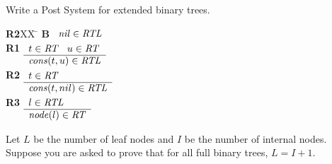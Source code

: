 \documentclass[]{exam}
\begin{document}
\begin{questions}
\begin{solution}
\end{solution}
\question Write a Post System for extended binary trees.
\begin{solution}
\begin{tabbing}
{\bf R2}XX \=  \kill
{\bf B} \>
        \(\begin{array}[t]{l}
        \mbox{\it nil\/}\in\mbox{\it RTL\/}
        \end{array}\) \\[2ex]
{\bf R1} \>
        \(\begin{array}[t]{l}
        t\in\mbox{\it RT\/}\;\;\;u\in\mbox{\it RT\/} \\
        \hline
        \mbox{\it cons\/}(t,u)\in\mbox{\it RTL\/}
        \end{array}\) \\[2ex]
{\bf R2} \>
        \(\begin{array}[t]{l}
        t\in\mbox{\it RT\/} \\
        \hline
        \mbox{\it cons\/}(t,nil)\in\mbox{\it RTL\/}
        \end{array}\) \\[2ex]
{\bf R3} \>
        \(\begin{array}[t]{l}
        l\in\mbox{\it RTL\/} \\
        \hline
        \mbox{\it node\/}(l)\in\mbox{\it RT\/}
        \end{array}\)

\end{tabbing}

\end{solution}

\question Let $L$ be the number of leaf nodes and $I$ be the number
          of internal nodes. Suppose you are asked to prove that for all 
          full binary trees, $L = I + 1$.
\end{questions}
\end{document}

